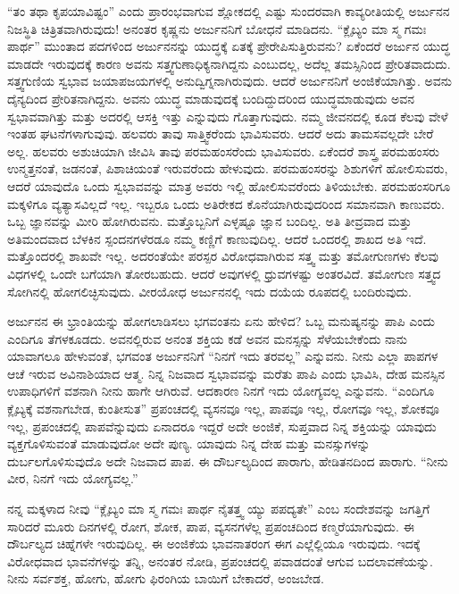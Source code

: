 “ತಂ ತಥಾ ಕೃಪಯಾವಿಷ್ಟಂ” ಎಂದು ಪ್ರಾರಂಭವಾಗುವ ಶ್ಲೋಕದಲ್ಲಿ ಎಷ್ಟು ಸುಂದರವಾಗಿ ಕಾವ್ಯರೀತಿಯಲ್ಲಿ ಅರ್ಜುನನ ನಿಜಸ್ಥಿತಿ ಚಿತ್ರಿತವಾಗಿರುವುದು! ಅನಂತರ ಕೃಷ್ಣನು ಅರ್ಜುನನಿಗೆ ಬೋಧನೆ ಮಾಡಿದನು. “ಕ್ಲೈಬ್ಯಂ ಮಾ ಸ್ಮ ಗಮಃ ಪಾರ್ಥ” ಮುಂತಾದ ಪದಗಳಿಂದ ಅರ್ಜುನನನ್ನು ಯುದ್ಧಕ್ಕೆ ಏತಕ್ಕೆ ಪ್ರೇರೇಪಿಸುತ್ತಿರುವನು? ಏಕೆಂದರೆ ಅರ್ಜುನ ಯುದ್ಧ ಮಾಡದೇ ಇರುವುದಕ್ಕೆ ಕಾರಣ ಅವನು ಸತ್ತ್ವಗುಣಾಧಿಕ್ಯನಾಗಿದ್ದನು ಎಂಬುದಲ್ಲ, ಅದೆಲ್ಲ ತಮಸ್ಸಿನಿಂದ ಪ್ರೇರಿತವಾದುದು. ಸತ್ತ್ವಗುಣಿಯ ಸ್ವಭಾವ ಜಯಾಪಜಯಗಳಲ್ಲಿ ಅನುದ್ವಿಗ್ನನಾಗಿರುವುದು. ಆದರೆ ಅರ್ಜುನನಿಗೆ ಅಂಜಿಕೆಯಾಗಿತ್ತು. ಅವನು ದೈನ್ಯದಿಂದ ಪ್ರೇರಿತನಾಗಿದ್ದನು. ಅವನು ಯುದ್ಧ ಮಾಡುವುದಕ್ಕೆ ಬಂದಿದ್ದುದರಿಂದ ಯುದ್ಧಮಾಡುವುದು ಅವನ ಸ್ವಭಾವವಾಗಿತ್ತು ಮತ್ತು ಅದರಲ್ಲಿ ಆಸಕ್ತಿ ಇತ್ತು ಎನ್ನುವುದು ಗೊತ್ತಾಗುವುದು. ನಮ್ಮ ಜೀವನದಲ್ಲಿ ಕೂಡ ಕೆಲವು ವೇಳೆ ಇಂತಹ ಘಟನೆಗಳಾಗುವುವು. ಹಲವರು ತಾವು ಸಾತ್ತ್ವಿಕರೆಂದು ಭಾವಿಸುವರು. ಆದರೆ ಅದು ತಾಮಸವಲ್ಲದೇ ಬೇರೆ ಅಲ್ಲ. ಹಲವರು ಅಶುಚಿಯಾಗಿ ಜೀವಿಸಿ ತಾವು ಪರಮಹಂಸರೆಂದು ಭಾವಿಸುವರು. ಏಕೆಂದರೆ ಶಾಸ್ತ್ರ ಪರಮಹಂಸರು ಉನ್ಮತ್ತನಂತೆ, ಜಡನಂತೆ, ಪಿಶಾಚಿಯಂತೆ ಇರುವರೆಂದು ಹೇಳುವುದು. ಪರಮಹಂಸರನ್ನು ಶಿಶುಗಳಿಗೆ ಹೋಲಿಸುವರು, ಆದರೆ ಯಾವುದೊ ಒಂದು ಸ್ವಭಾವವನ್ನು ಮಾತ್ರ ಅವರು ಇಲ್ಲಿ ಹೋಲಿಸುವರೆಂದು ತಿಳಿಯಬೇಕು. ಪರಮಹಂಸರಿಗೂ ಮಕ್ಕಳಿಗೂ ವ್ಯತ್ಯಾಸವಿಲ್ಲದೆ ಇಲ್ಲ. ಇಬ್ಬರೂ ಒಂದು ಅತಿರೇಕದ ಕೊನೆಯಾಗಿರುವುದರಿಂದ ಸಮಾನವಾಗಿ ಕಾಣುವರು. ಒಬ್ಬ ಜ್ಞಾನವನ್ನು ಮೀರಿ ಹೋಗಿರುವನು. ಮತ್ತೊಬ್ಬನಿಗೆ ಎಳ್ಳಷ್ಟೂ ಜ್ಞಾನ ಬಂದಿಲ್ಲ. ಅತಿ ತೀವ್ರವಾದ ಮತ್ತು ಅತಿಮಂದವಾದ ಬೆಳಕಿನ ಸ್ಪಂದನಗಳೆರಡೂ ನಮ್ಮ ಕಣ್ಣಿಗೆ ಕಾಣುವುದಿಲ್ಲ. ಆದರೆ ಒಂದರಲ್ಲಿ ಶಾಖದ ಅತಿ ಇದೆ. ಮತ್ತೊಂದರಲ್ಲಿ ಶಾಖವೇ ಇಲ್ಲ. ಅದರಂತೆಯೇ ಪರಸ್ಪರ ವಿರೋಧವಾಗಿರುವ ಸತ್ತ್ವ ಮತ್ತು ತಮೋಗುಣಗಳು ಕೆಲವು ವಿಧಗಳಲ್ಲಿ ಒಂದೇ ಬಗೆಯಾಗಿ ತೋರಬಹುದು. ಆದರೆ ಅವುಗಳಲ್ಲಿ ಧ್ರುವಗಳಷ್ಟು ಅಂತರವಿದೆ. ತಮೋಗುಣ ಸತ್ತ್ವದ ಸೋಗಿನಲ್ಲಿ ಹೋಗಲಿಚ್ಛಿಸುವುದು. ವೀರಯೋಧ ಅರ್ಜುನನಲ್ಲಿ ಇದು ದಯೆಯ ರೂಪದಲ್ಲಿ ಬಂದಿರುವುದು.

ಅರ್ಜುನನ ಈ ಭ್ರಾಂತಿಯನ್ನು ಹೋಗಲಾಡಿಸಲು ಭಗವಂತನು ಏನು ಹೇಳಿದ? ಒಬ್ಬ ಮನುಷ್ಯನನ್ನು ಪಾಪಿ ಎಂದು ಎಂದಿಗೂ ತೆಗಳಕೂಡದು. ಅವನಲ್ಲಿರುವ ಅನಂತ ಶಕ್ತಿಯ ಕಡೆ ಅವನ ಮನಸ್ಸನ್ನು ಸೆಳೆಯಬೇಕೆಂದು ನಾನು ಯಾವಾಗಲೂ ಹೇಳುವಂತೆ, ಭಗವಂತ ಅರ್ಜುನನಿಗೆ “ನಿನಗೆ ಇದು ತರವಲ್ಲ” ಎನ್ನುವನು. ನೀನು ಎಲ್ಲಾ ಪಾಪಗಳ ಆಚೆ ಇರುವ ಅವಿನಾಶಿಯಾದ ಆತ್ಮ. ನಿನ್ನ ನಿಜವಾದ ಸ್ವಭಾವವನ್ನು ಮರೆತು ಪಾಪಿ ಎಂದು ಭಾವಿಸಿ, ದೇಹ ಮನಸ್ಸಿನ ಉಪಾಧಿಗಳಿಗೆ ವಶನಾಗಿ ನೀನು ಹಾಗೇ ಆಗಿರುವೆ. ಆದಕಾರಣ ನಿನಗೆ ಇದು ಯೋಗ್ಯವಲ್ಲ ಎನ್ನುವನು. “ಎಂದಿಗೂ ಕ್ಲೈಬ್ಯಕ್ಕೆ ವಶನಾಗಬೇಡ, ಕುಂತೀಸುತ” ಪ್ರಪಂಚದಲ್ಲಿ ವ್ಯಸನವೂ ಇಲ್ಲ, ಪಾಪವೂ ಇಲ್ಲ, ರೋಗವೂ ಇಲ್ಲ, ಶೋಕವೂ ಇಲ್ಲ, ಪ್ರಪಂಚದಲ್ಲಿ ಪಾಪವೆನ್ನುವುದು ಏನಾದರೂ ಇದ್ದರೆ ಅದೇ ಅಂಜಿಕೆ, ಸುಪ್ತವಾದ ನಿನ್ನ ಶಕ್ತಿಯನ್ನು ಯಾವುದು ವ್ಯಕ್ತಗೊಳಿಸುವಂತೆ ಮಾಡುವುದೋ ಅದೇ ಪುಣ್ಯ. ಯಾವುದು ನಿನ್ನ ದೇಹ ಮತ್ತು ಮನಸ್ಸುಗಳನ್ನು ದುರ್ಬಲಗೊಳಿಸುವುದೊ ಅದೇ ನಿಜವಾದ ಪಾಪ. ಈ ದೌರ್ಬಲ್ಯದಿಂದ ಪಾರಾಗು, ಹೇಡಿತನದಿಂದ ಪಾರಾಗು. “ನೀನು ವೀರ, ನಿನಗೆ ಇದು ಯೋಗ್ಯವಲ್ಲ.”

ನನ್ನ ಮಕ್ಕಳಾದ ನೀವು “ಕ್ಲೈಬ್ಯಂ ಮಾ ಸ್ಮ ಗಮಃ ಪಾರ್ಥ ನೈತತ್ತ್ವ ಯ್ಯು ಪಪದ್ಯತೇ” ಎಂಬ ಸಂದೇಶವನ್ನು ಜಗತ್ತಿಗೆ ಸಾರಿದರೆ ಮೂರು ದಿನಗಳಲ್ಲಿ ರೋಗ, ಶೋಕ, ಪಾಪ, ವ್ಯಸನಗಳೆಲ್ಲ ಪ್ರಪಂಚದಿಂದ ಕಣ್ಮರೆಯಾಗುವುದು. ಈ ದೌರ್ಬಲ್ಯದ ಚಿಹ್ನೆಗಳೇ ಇರುವು\-ದಿಲ್ಲ. ಈ ಅಂಜಿಕೆಯ ಭಾವನಾತರಂಗ ಈಗ ಎಲ್ಲೆಲ್ಲಿಯೂ ಇರುವುದು. ಇದಕ್ಕೆ ವಿರೋಧ\-ವಾದ ಭಾವನೆಗಳನ್ನು ತನ್ನಿ, ಅನಂತರ ನೋಡಿ, ಪ್ರಪಂಚದಲ್ಲಿ ಪವಾಡದಂತೆ ಆಗುವ ಬದಲಾವಣೆಯನ್ನು. ನೀನು ಸರ್ವಶಕ್ತ, ಹೋಗು, ಹೋಗು ಫಿರಂಗಿಯ ಬಾಯಿಗೆ ಬೇಕಾದರೆ, ಅಂಜಬೇಡ.

